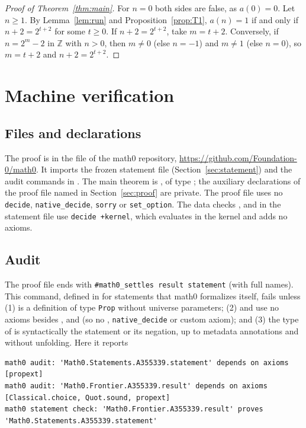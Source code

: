 \documentclass[11pt]{amsart}
\theoremstyle{plain}
\theoremstyle{definition}
\newcommand{\Z}{\mathbb{Z}}
\begin{document}
\begin{proof}[Proof of Theorem~\ref{thm:main}]
For $n=0$ both sides are false, as $a(0)=0$. Let $n\ge1$. By Lemma~\ref{lem:run} and Proposition~\ref{prop:T1}, $a(n)=1$ if and only if $n+2=2^{t+2}$ for some $t\ge0$. If $n+2=2^{t+2}$, take $m=t+2$. Conversely, if $n=2^m-2$ in $\Z$ with $n>0$, then $m\ne0$ (else $n=-1$) and $m\ne1$ (else $n=0$), so $m=t+2$ and $n+2=2^{t+2}$.
\end{proof}

\section{Machine verification}\label{sec:lean}

\subsection*{Files and declarations}
The proof is in the file  of the math0 repository, \url{https://github.com/Foundation-0/math0}. It imports the frozen statement file  (Section~\ref{sec:statement}) and the audit commands in . The main theorem is , of type ; the auxiliary declarations of the proof file named in Section~\ref{sec:proof} are private. The proof file uses no \texttt{decide}, \texttt{native\_decide}, \texttt{sorry} or \texttt{set\_option}. The data checks ,  and  in the statement file use \texttt{decide +kernel}, which evaluates in the kernel and adds no axioms.

\subsection*{Audit}
The proof file ends with \texttt{\#math0\_settles result statement} (with full names). This command, defined in  for statements that math0 formalizes itself, fails unless (1)  is a definition of type \texttt{Prop} without universe parameters; (2)  and  use no axioms besides ,  and  (so no , \texttt{native\_decide} or custom axiom); and (3) the type of  is syntactically the statement or its negation, up to metadata annotations and without unfolding. Here it reports
\begin{lstlisting}[basicstyle=\ttfamily\tiny]
math0 audit: 'Math0.Statements.A355339.statement' depends on axioms [propext]
math0 audit: 'Math0.Frontier.A355339.result' depends on axioms [Classical.choice, Quot.sound, propext]
math0 statement check: 'Math0.Frontier.A355339.result' proves 'Math0.Statements.A355339.statement'
\end{lstlisting}
\end{document}
